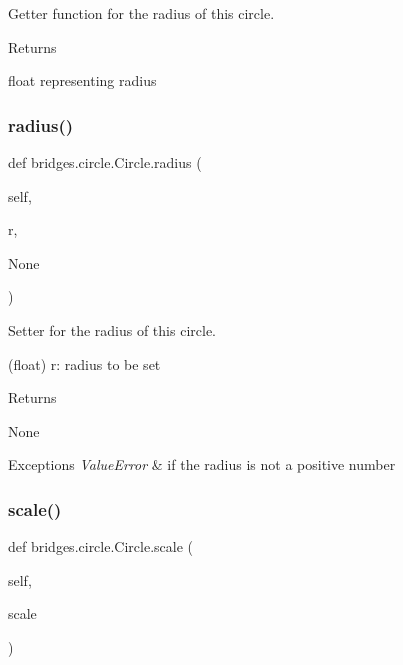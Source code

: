 Getter function for the radius of this circle. 

\begin{DoxyReturn}{Returns}


float representing radius 
\end{DoxyReturn}
\mbox{\label{classbridges_1_1circle_1_1_circle_ae7c2dc54c90d954626f99d7561009587}} 
\subsubsection{\texorpdfstring{radius()}{radius()}\hspace{0.1cm}{\footnotesize\ttfamily [2/2]}}
{\footnotesize\ttfamily def bridges.\+circle.\+Circle.\+radius (\begin{DoxyParamCaption}\item[{}]{self,  }\item[{}]{r,  }\item[{}]{None }\end{DoxyParamCaption})}



Setter for the radius of this circle. 

(float) r\+: radius to be set \begin{DoxyReturn}{Returns}


None
\end{DoxyReturn}

\begin{DoxyExceptions}{Exceptions}
{\em Value\+Error} & if the radius is not a positive number \\
\hline
\end{DoxyExceptions}
\mbox{\label{classbridges_1_1circle_1_1_circle_ac594fe605b117b591690588c5469ceac}} 
\subsubsection{\texorpdfstring{scale()}{scale()}}
{\footnotesize\ttfamily def bridges.\+circle.\+Circle.\+scale (\begin{DoxyParamCaption}\item[{}]{self,  }\item[{}]{scale }\end{DoxyParamCaption})}

